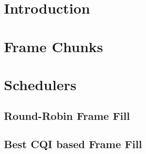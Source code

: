 \section{Introduction}
\section{Frame Chunks}
\section{Schedulers}
	\subsection{Round-Robin Frame Fill}
	\subsection{Best CQI based Frame Fill}